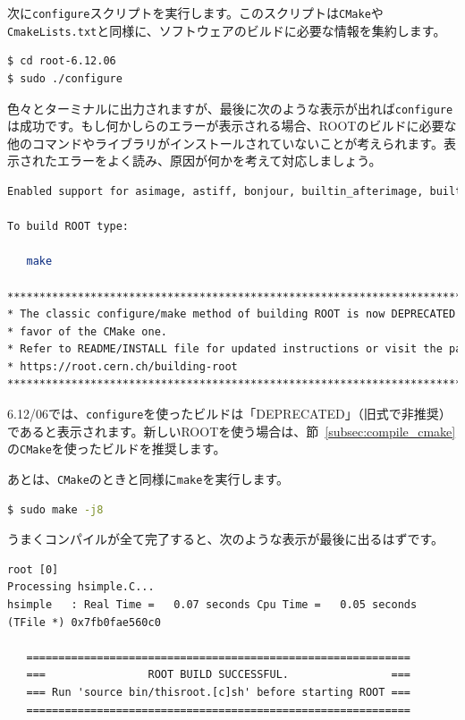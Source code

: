 次に\texttt{configure}スクリプトを実行します。このスクリプトは\texttt{CMake}や\texttt{CmakeLists.txt}と同様に、ソフトウェアのビルドに必要な情報を集約します。

\begin{lstlisting}[language=bash]
$ cd root-6.12.06
$ sudo ./configure
\end{lstlisting}

色々とターミナルに出力されますが、最後に次のような表示が出れば\texttt{configure}は成功です。もし何かしらのエラーが表示される場合、ROOTのビルドに必要な他のコマンドやライブラリがインストールされていないことが考えられます。表示されたエラーをよく読み、原因が何かを考えて対応しましょう。
\begin{lstlisting}[language=bash]
Enabled support for asimage, astiff, bonjour, builtin_afterimage, builtin_ftgl, builtin_freetype, builtin_gl2ps, builtin_glew, builtin_unuran, builtin_lz4, builtin_llvm, libcxx, cocoa, explicitlink, fink, fitsio, gviz, genvector, krb5, ldap, memstat, opengl, python, rpath, search_usrlocal, shared, sqlite, tmva, xml.

To build ROOT type:

   make 

******************************************************************************
* The classic configure/make method of building ROOT is now DEPRECATED in    *
* favor of the CMake one.                                                    *
* Refer to README/INSTALL file for updated instructions or visit the page    *
* https://root.cern.ch/building-root                                         *
******************************************************************************
\end{lstlisting}
6.12/06では、\texttt{configure}を使ったビルドは「DEPRECATED」（旧式で非推奨）であると表示されます。新しいROOTを使う場合は、節~\ref{subsec:compile_cmake}の\texttt{CMake}を使ったビルドを推奨します。

あとは、\texttt{CMake}のときと同様に\texttt{make}を実行します。
\begin{lstlisting}[language=bash]
$ sudo make -j8
\end{lstlisting}
うまくコンパイルが全て完了すると、次のような表示が最後に出るはずです。
\begin{lstlisting}
root [0] 
Processing hsimple.C...
hsimple   : Real Time =   0.07 seconds Cpu Time =   0.05 seconds
(TFile *) 0x7fb0fae560c0
 
   ============================================================
   ===                ROOT BUILD SUCCESSFUL.                ===
   === Run 'source bin/thisroot.[c]sh' before starting ROOT ===
   ============================================================
\end{lstlisting}

